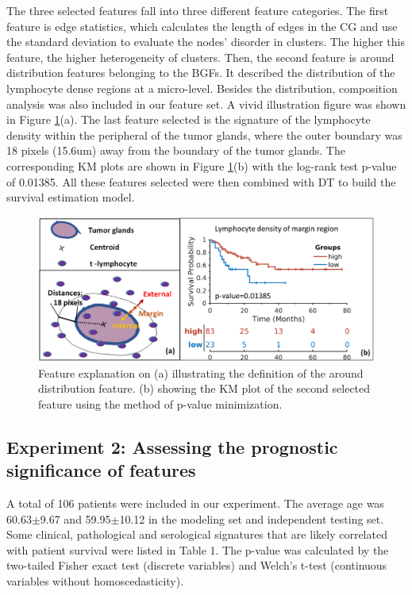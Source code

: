 \documentclass[num-refs]{wiley-article}
\begin{document}
The three selected features fall into three different feature categories. The first feature is edge statistics, which calculates the length of edges in the CG and use the standard deviation to evaluate the nodes' disorder in clusters. The higher this feature, the higher heterogeneity of clusters. Then, the second feature is around distribution features belonging to the BGFs. It described the distribution of the lymphocyte dense regions at a micro-level. Besides the distribution, composition analysis was also included in our feature set. A vivid illustration figure was shown in Figure \ref{fig4}(a). The last feature selected is the signature of the lymphocyte density within the peripheral of the tumor glands, where the outer boundary was 18 pixels (15.6um) away from the boundary of the tumor glands. The corresponding KM plots are shown in Figure \ref{fig4}(b) with the log-rank test p-value of 0.01385. All these features selected were then combined with DT to build the survival estimation model.

\begin{figure}[h!]
\centering
\includegraphics[scale=0.24]{FIG/fig4.eps}
\caption{Feature explanation on (a) illustrating the definition of the around distribution feature. (b) showing the KM plot of the second selected feature using the method of p-value minimization.}
\label{fig4}
\end{figure}

\subsection{Experiment 2: Assessing the prognostic significance of features}
\label{exp3}
A total of 106 patients were included in our experiment. The average age was 60.63$\pm$9.67 and 59.95$\pm$10.12 in the modeling set and independent testing set. Some clinical, pathological and serological signatures that are likely correlated with patient survival were listed in Table 1. The p-value was calculated by the two-tailed Fisher exact test (discrete variables) and Welch’s t-test (continuous variables without homoscedasticity). 
\end{document}
